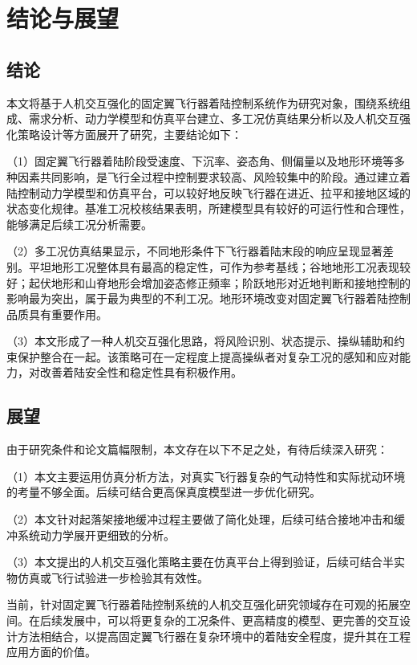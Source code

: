\chapter{结论与展望}

\section{结论}

本文将基于人机交互强化的固定翼飞行器着陆控制系统作为研究对象，围绕系统组成、需求分析、动力学模型和仿真平台建立、多工况仿真结果分析以及人机交互强化策略设计等方面展开了研究，主要结论如下：

（1）固定翼飞行器着陆阶段受速度、下沉率、姿态角、侧偏量以及地形环境等多种因素共同影响，是飞行全过程中控制要求较高、风险较集中的阶段。通过建立着陆控制动力学模型和仿真平台，可以较好地反映飞行器在进近、拉平和接地区域的状态变化规律。基准工况校核结果表明，所建模型具有较好的可运行性和合理性，能够满足后续工况分析需要。

（2）多工况仿真结果显示，不同地形条件下飞行器着陆末段的响应呈现显著差别。平坦地形工况整体具有最高的稳定性，可作为参考基线；谷地地形工况表现较好；起伏地形和山脊地形会增加姿态修正频率；阶跃地形对近地判断和接地控制的影响最为突出，属于最为典型的不利工况。地形环境改变对固定翼飞行器着陆控制品质具有重要作用。

（3）本文形成了一种人机交互强化思路，将风险识别、状态提示、操纵辅助和约束保护整合在一起。该策略可在一定程度上提高操纵者对复杂工况的感知和应对能力，对改善着陆安全性和稳定性具有积极作用。

\section{展望}

由于研究条件和论文篇幅限制，本文存在以下不足之处，有待后续深入研究：

（1）本文主要运用仿真分析方法，对真实飞行器复杂的气动特性和实际扰动环境的考量不够全面。后续可结合更高保真度模型进一步优化研究。

（2）本文针对起落架接地缓冲过程主要做了简化处理，后续可结合接地冲击和缓冲系统动力学展开更细致的分析。

（3）本文提出的人机交互强化策略主要在仿真平台上得到验证，后续可结合半实物仿真或飞行试验进一步检验其有效性。

当前，针对固定翼飞行器着陆控制系统的人机交互强化研究领域存在可观的拓展空间。在后续发展中，可以将更复杂的工况条件、更高精度的模型、更完善的交互设计方法相结合，以提高固定翼飞行器在复杂环境中的着陆安全程度，提升其在工程应用方面的价值。
